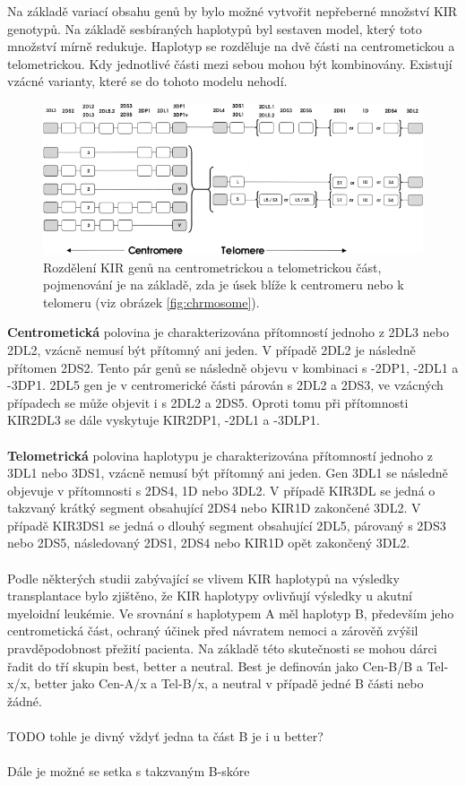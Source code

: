 \documentclass[czech,DP]{thesiskiv}
\numberwithin{equation}{section}
\begin{document}
\noindent
Na základě variací obsahu genů by bylo možné vytvořit nepřeberné množství KIR genotypů. Na základě sesbíraných haplotypů byl sestaven model, který toto množství mírně redukuje. Haplotyp se rozděluje na dvě části na centrometickou a telometrickou. Kdy jednotlivé části mezi sebou mohou být kombinovány. Existují vzácné varianty, které se do tohoto modelu nehodí. \cite{KIR_haplotypy_ct}
\begin{figure}[H]		
		\centering
		\includegraphics[width=\textwidth]{./img/KIR_haplotypy.png}
		\caption{Rozdělení KIR genů na centrometrickou a telometrickou část, pojmenování je na základě, zda je úsek blíže k centromeru nebo k telomeru (viz obrázek \ref{fig:chrmosome}). \cite{KIR_haplotypy_ct}}
		\label{fig:kir_aplotypy_ct}
\end{figure}

\noindent 
\textbf{Centrometická} polovina je charakterizována přítomností jednoho z 2DL3 nebo 2DL2, vzácně nemusí být přítomný ani jeden. V případě 2DL2 je následně přítomen 2DS2. Tento pár genů se následně objevu v kombinaci s -2DP1, -2DL1 a -3DP1. 2DL5 gen je v centromerické části párován s 2DL2 a 2DS3, ve vzácných případech se může objevit i s 2DL2 a 2DS5. Oproti tomu při přítomnosti KIR2DL3 se dále vyskytuje KIR2DP1, -2DL1 a -3DLP1.
\\
\\
\textbf{Telometrická} polovina haplotypu je charakterizována přítomností jednoho z 3DL1 nebo 3DS1, vzácně nemusí být přítomný ani jeden. Gen 3DL1 se následně objevuje v přítomnosti s 2DS4, 1D nebo 3DL2. V případě KIR3DL se jedná o takzvaný krátký segment obsahující 2DS4 nebo KIR1D zakončené 3DL2. V případě KIR3DS1 se jedná o dlouhý segment obsahující 2DL5, párovaný s 2DS3 nebo 2DS5, následovaný 2DS1, 2DS4 nebo KIR1D opět zakončený 3DL2. \cite{KIR_haplotypy_ct}
\\
\\
Podle některých studii zabývající se vlivem KIR haplotypů na výsledky transplantace bylo zjištěno, že KIR haplotypy ovlivňují výsledky u akutní myeloidní leukémie. Ve srovnání s haplotypem A měl haplotyp B, především jeho centrometická část, ochraný účinek před návratem nemoci a zárověň zvýšil pravděpodobnost přežití pacienta. Na základě této skutečnosti se mohou dárci řadit do tří skupin best, better a neutral. Best je definován jako Cen-B/B a Tel-x/x, better jako Cen-A/x a Tel-B/x, a neutral v případě jedné B části nebo žádné. \cite{KIR_haplotypy}
\\
\\
TODO tohle je divný vždyť jedna ta část B je i u better?
\\
\\
Dále je možné se setka s takzvaným B-skóre
\end{document}
